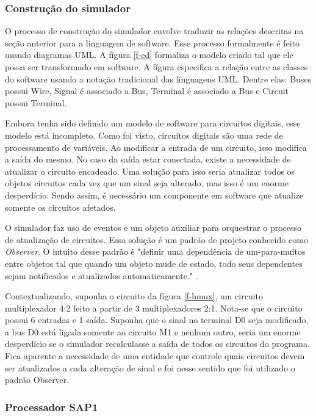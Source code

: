 \subsubsection{Construção do simulador}

O processo de construção do simulador envolve traduzir as relações descritas na seção anterior para a linguagem de software.
Esse processo formalmente é feito usando diagramas UML.
A fígura \ref{f-cd} formaliza o modelo criado tal que ele possa ser transformado em software.
A fígura especifica a relação entre as classes do software usando a notação tradicional das linguagens UML.
Dentre elas: Buses possui Wire, Signal é associado a Bus, Terminal é associado a Bus e Circuit possui Terminal.

\figcd

Embora tenha sido definido um modelo de software para circuitos digitais, esse modelo está incompleto.
Como foi visto, circuitos digitais são uma rede de processamento de variáveis.
Ao modificar a entrada de um circuito, isso modifica a saída do mesmo.
No caso da saída estar conectada, existe a necessidade de atualizar o circuito encadeado.
Uma solução para isso seria atualizar todos os objetos circuitos cada vez que um sinal seja alterado, mas isso é um enorme desperdício.
Sendo assim, é necessário um componente em software que atualize somente os circuitos afetados.

O simulador faz uso de eventos e um objeto auxiliar para orquestrar o processo de atualização de circuitos.
Essa solução é um padrão de projeto conhecido como \emph{Observer}.
O intuito desse padrão é "definir uma dependência de um-para-muitos entre objetos tal que quando um objeto mude de estado, todo seus dependentes sejam notificados e atualizados automaticamente." \cite{gof}. 

\fighmux

Contextualizando, suponha o circuito da fígura \ref{f-hmux}, um circuito multiplexador 4:2 feito a partir de 3 multiplexadores 2:1.
Nota-se que o circuito possui 6 entradas e 1 saída.
Suponha que o sinal no terminal D0 seja modificado, a bus D0 está ligada somente ao circuito M1 e nenhum outro, seria um enorme desperdício se o simulador recalculasse a saída de todos os circuitos do programa.
Fica aparente a necessidade de uma entidade que controle quais circuitos devem ser atualizados a cada alteração de sinal e foi nesse sentido que foi utilizado o padrão Observer.


\subsubsection{Processador SAP1}
